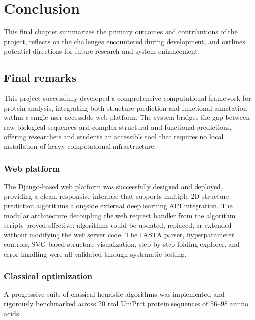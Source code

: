 \chapter{Conclusion}
\label{conclusion}

This final chapter summarizes the primary outcomes and contributions of the project, reflects on the challenges encountered during development, and outlines potential directions for future research and system enhancement.

\section{Final remarks}
\label{conclusion:finalRemarks}

This project successfully developed a comprehensive computational framework for protein analysis, integrating both structure prediction and functional annotation within a single user-accessible web platform. The system bridges the gap between raw biological sequences and complex structural and functional predictions, offering researchers and students an accessible tool that requires no local installation of heavy computational infrastructure.

\subsection{Web platform}
\label{conclusion:sub_web}

The Django-based web platform was successfully designed and deployed, providing a clean, responsive interface that supports multiple 2D structure prediction algorithms alongside external deep learning API integration. The modular architecture decoupling the web request handler from the algorithm scripts proved effective: algorithms could be updated, replaced, or extended without modifying the web server code. The FASTA parser, hyperparameter controls, SVG-based structure visualization, step-by-step folding explorer, and error handling were all validated through systematic testing.

\subsection{Classical optimization}
\label{conclusion:sub_classical}

A progressive suite of classical heuristic algorithms was implemented and rigorously benchmarked across 20 real UniProt protein sequences of 56--98 amino acids:

